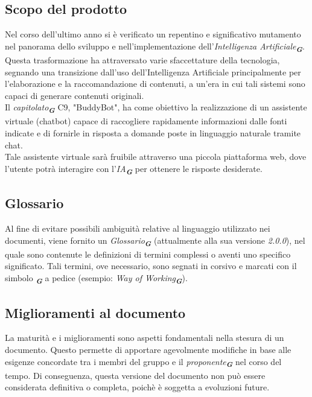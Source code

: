 \subsection{Scopo del prodotto}
Nel corso dell'ultimo anno si è verificato un repentino e significativo mutamento nel panorama
dello sviluppo e nell'implementazione dell'\emph{Intelligenza Artificiale}\textsubscript{\textit{\textbf{G}}}.
Questa trasformazione ha attraversato varie sfaccettature della tecnologia, segnando una transizione dall'uso
dell'Intelligenza Artificiale principalmente per l'elaborazione e la raccomandazione di contenuti, a un'era in
cui tali sistemi sono capaci di generare contenuti originali. \\
Il \emph{capitolato}\textsubscript{\textit{\textbf{G}}} C9, "BuddyBot", ha come obiettivo la realizzazione di un assistente virtuale (chatbot) 
capace di raccogliere rapidamente informazioni dalle fonti indicate e di fornirle in risposta a domande poste in 
linguaggio naturale tramite chat.\\
Tale assistente virtuale sarà fruibile attraverso una piccola piattaforma web, dove l'utente potrà interagire con l'\emph{IA}\textsubscript{\textit{\textbf{G}}} 
per ottenere le risposte desiderate.

\subsection{Glossario}
Al fine di evitare possibili ambiguità relative al linguaggio utilizzato nei documenti, viene fornito un \emph{Glossario}\textsubscript{\textit{\textbf{G}}}
(attualmente alla sua versione \emph{2.0.0}), nel quale sono contenute le definizioni di termini complessi o aventi uno 
specifico significato. Tali termini, ove necessario, sono segnati in corsivo e marcati con il simbolo \textsubscript{\textit{\textbf{G}}} a pedice
(esempio: \emph{Way of Working}\textsubscript{\textit{\textbf{G}}}).

\subsection{Miglioramenti al documento}
La maturità e i miglioramenti sono aspetti fondamentali nella stesura di un documento.
Questo permette di apportare agevolmente modifiche in base alle esigenze concordate tra i
membri del gruppo e il \emph{proponente}\textsubscript{\textit{\textbf{G}}} nel corso del tempo. Di conseguenza, questa versione del
documento non può essere considerata definitiva o completa, poichè è soggetta a evoluzioni future.

